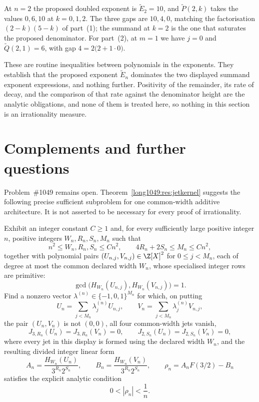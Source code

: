 \documentclass[11pt]{article}
\begin{document}
\begin{example}\label{long1049:ex:pade}
At $n=2$ the proposed doubled exponent is $\widetilde{E}_2=10$, and
$\widetilde{P}(2,k)$ takes the values $0,6,10$ at $k=0,1,2$.  The three gaps are
$10,4,0$, matching the factorisation $(2-k)(5-k)$ of part~(1); the summand at
$k=2$ is the one that saturates the proposed denominator.  For part~(2), at
$m=1$ we have $j=0$ and $\widetilde{Q}(2,1)=6$, with gap
$4=2\bigl(2+1\cdot0\bigr)$.
\end{example}

These are routine inequalities between polynomials in the exponents.  They
establish that the proposed exponent $\widetilde{E}_n$ dominates the two
displayed summand exponent expressions, and nothing further.  Positivity of the remainder, its rate of
decay, and the comparison of that rate against the denominator height are the
analytic obligations, and none of them is treated here, so nothing in this
section is an irrationality measure.

\section{Complements and further questions}\label{long1049:sec:open}

Problem~\#1049 remains open.  Theorem~\ref{long1049:res:jetkernel} suggests the following precise sufficient
subproblem for one common-width additive architecture.  It is not asserted to
be necessary for every proof of irrationality.

\begin{problem}\label{long1049:prob:kernel}
Exhibit an integer constant \(C\ge1\) and, for every sufficiently large
positive integer \(n\), positive integers \(W_n,R_n,S_n,M_n\) such that
\[
 n^2\le W_n,R_n,S_n\le Cn^2,
 \qquad 4R_n+2S_n\le M_n\le Cn^2,
\]
together with polynomial pairs
\((U_{n,j},V_{n,j})\in\Z[X]^2\) for \(0\le j<M_n\), each of degree at most
the common declared width \(W_n\), whose specialised integer rows are
primitive:
\[
 \gcd\!\bigl(H_{W_n}(U_{n,j}),H_{W_n}(V_{n,j})\bigr)=1.
\]
Find a nonzero vector
\(\lambda^{(n)}\in\{-1,0,1\}^{M_n}\) for which, on putting
\[
 U_n=\sum_{j<M_n}\lambda^{(n)}_jU_{n,j},
 \qquad V_n=\sum_{j<M_n}\lambda^{(n)}_jV_{n,j},
\]
the pair \((U_n,V_n)\) is not \((0,0)\), all four common-width jets vanish,
\[
 J_{3,R_n}(U_n)=J_{3,R_n}(V_n)=0,
 \qquad J_{2,S_n}(U_n)=J_{2,S_n}(V_n)=0,
\]
where every jet in this display is formed using the declared width \(W_n\),
and the resulting divided integer linear form
\[
 A_n=\frac{H_{W_n}(U_n)}{3^{R_n}2^{S_n}},
 \qquad
 B_n=\frac{H_{W_n}(V_n)}{3^{R_n}2^{S_n}},
 \qquad
 \rho_n=A_nF(3/2)-B_n
\]
satisfies the explicit analytic condition
\[
 0<|\rho_n|<\frac1n.
\]
\end{problem}
\end{document}
